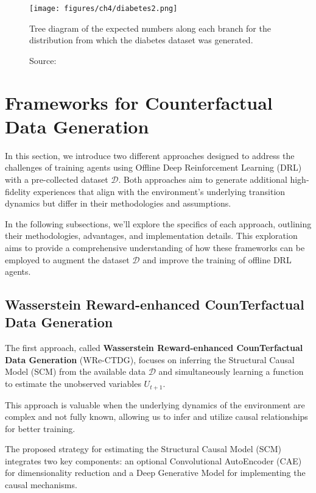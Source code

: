 \begin{figure}[h]
    \centering
    \texttt{[image: figures/ch4/diabetes2.png]}
    \caption{Tree diagram of the expected numbers
    along each branch for the distribution from which the diabetes
    dataset was generated.}
    \vspace{-10px}
    \caption*{\scriptsize{Source: \cite{sim2012}}}
    \label{fig:diabetes2}
\end{figure}

\section{Frameworks for Counterfactual Data Generation}

In this section, we introduce two different approaches designed to
address the challenges of training agents using Offline
Deep Reinforcement Learning (DRL) with a pre-collected dataset \( \mathcal{D} \).
Both approaches aim to generate additional high-fidelity experiences
that align with the environment's underlying transition dynamics
but differ in their methodologies and assumptions.

In the following subsections, we'll explore the specifics
of each approach, outlining their methodologies, advantages, and
implementation details. This exploration aims to
provide a comprehensive understanding of how these
frameworks can be employed to augment the dataset \( \mathcal{D} \) and improve
the training of offline DRL agents.

\subsection{Wasserstein Reward-enhanced CounTerfactual\\ Data Generation}
\label{sec:wre}

The first approach, called \textbf{Wasserstein Reward-enhanced CounTerfactual Data Generation}
(WRe-CTDG),
focuses on inferring the Structural Causal Model
(SCM) from the available data \( \mathcal{D} \) and simultaneously learning
a function to estimate the unobserved variables $U_{t+1}$.

This approach is valuable when the underlying dynamics of the
environment are complex and not fully known, allowing us to
infer and utilize causal relationships for better training.

The proposed strategy for estimating the Structural Causal Model (SCM)
integrates two key components: an optional Convolutional AutoEncoder (CAE)
for dimensionality reduction and a Deep Generative Model for
implementing the causal mechanisms.


